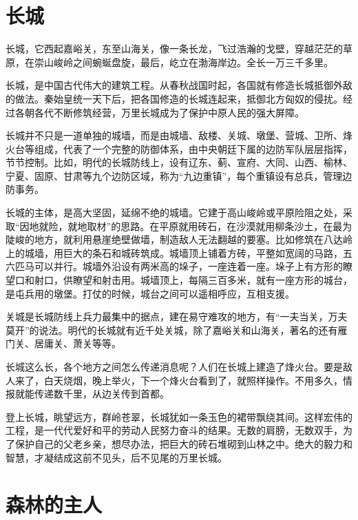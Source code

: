 \documentclass[12pt,UTF-8,openany]{ctexbook}
\begin{document}
\chapter{长城}

\begin{large}
    
    长城，它西起嘉峪关，东至山海关，像一条长龙，飞过浩瀚的戈壁，穿越茫茫的草原，在崇山峻岭之间蜿蜒盘旋，最后，屹立在渤海岸边。全长一万三千多里。
    
    长城，是中国古代伟大的建筑工程。从春秋战国时起，各国就有修造长城抵御外敌的做法。秦始皇统一天下后，把各国修造的长城连起来，抵御北方匈奴的侵扰。经过各朝各代不断修筑经营，万里长城成为了保护中原人民的强大屏障。
    
    长城并不只是一道单独的城墙，而是由城墙、敌楼、关城、墩堡、营城、卫所、烽火台等组成，代表了一个完整的防御体系，由中央朝廷下属的边防军队层层指挥，节节控制。比如，明代的长城防线上，设有辽东、蓟、宣府、大同、山西、榆林、宁夏、固原、甘肃等九个边防区域，称为“九边重镇”，每个重镇设有总兵，管理边防事务。
    
    长城的主体，是高大坚固，延绵不绝的城墙。它建于高山峻岭或平原险阻之处，采取“因地就险，就地取材”的思路。在平原就用砖石，在沙漠就用柳条沙土，在最为陡峻的地方，就利用悬崖绝壁做墙，制造敌人无法翻越的要塞。比如修筑在八达岭上的城墙，用巨大的条石和城砖筑成。城墙顶上铺着方砖，平整如宽阔的马路，五六匹马可以并行。城墙外沿设有两米高的垛子，一座连着一座。垛子上有方形的瞭望口和射口，供瞭望和射击用。城墙顶上，每隔三百多米，就有一座方形的城台，是屯兵用的墩堡。打仗的时候，城台之间可以遥相呼应，互相支援。
    
    关城是长城防线上兵力最集中的据点，建在易守难攻的地方，有“一夫当关，万夫莫开”的说法。明代的长城就有近千处关城，除了嘉峪关和山海关，著名的还有雁门关、居庸关、萧关等等。
    
    长城这么长，各个地方之间怎么传递消息呢？人们在长城上建造了烽火台。要是敌人来了，白天烧烟，晚上举火，下一个烽火台看到了，就照样操作。不用多久，情报就能传递数千里，从边关传到首都。
    
    登上长城，眺望远方，群岭苍翠，长城犹如一条玉色的裙带飘绕其间。这样宏伟的工程，是一代代爱好和平的劳动人民努力奋斗的结果。无数的肩膀，无数双手，为了保护自己的父老乡亲，想尽办法，把巨大的砖石堆砌到山林之中。绝大的毅力和智慧，才凝结成这前不见头，后不见尾的万里长城。
    
\end{large}



\chapter{森林的主人}
\end{document}
